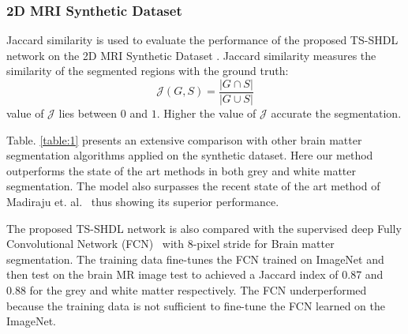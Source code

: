 \documentclass[10pt,twocolumn,letterpaper]{article}
\begin{document}
\subsubsection{2D MRI Synthetic Dataset}
Jaccard similarity is used to evaluate the performance of the proposed TS-SHDL network on the 2D MRI Synthetic Dataset \cite{kwan1999mri}. Jaccard similarity measures the similarity of the segmented regions with the ground truth:
\begin{equation}
\mathcal{J}(G,S)=\frac{\vert G \cap S \vert }{\vert G \cup S \vert}
\end{equation}
value of $\mathcal{J}$ lies between $0$ and $1$. Higher the value of $\mathcal{J}$ accurate the segmentation. 

Table. \ref{table:1} presents an extensive comparison with other brain matter segmentation algorithms applied on the synthetic dataset. Here our method outperforms the state of the art methods in both grey and white matter segmentation. The model also surpasses the recent state of the art method of Madiraju et. al.~\cite{madiraju2016level} thus showing its superior performance.

The proposed TS-SHDL network is also compared with the supervised deep Fully Convolutional Network (FCN)~\cite{cnn} with 8-pixel stride for Brain matter segmentation. The training data fine-tunes the FCN trained on ImageNet and then test on the brain MR image test to achieved a Jaccard index of 0.87 and 0.88 for the grey and white matter respectively. The FCN underperformed because the training data is not sufficient to fine-tune the FCN learned on the ImageNet.
\end{document}
